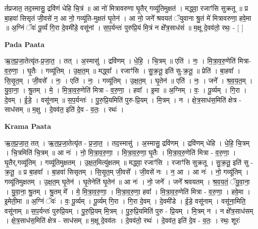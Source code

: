 \documentclass[17pt]{extarticle}
\begin{document}
र्तप्रजात॒ तद॒स्मासु॒ द्रवि॑णं धेहि चि॒त्रं ॥ आ नो॑ मित्रावरुणा घृ॒तैर् गव्यू॑तिमुक्षतं । मद्ध्वा॒ रजाꣳ॑सि सुक्रतू ॥ प्र बा॒हवा॑ सिसृतं जी॒वसे॑ न॒ आ नो॒ गव्यू॑ति-मुक्षतं घृ॒तेन॑ । आ नो॒ जने᳚ श्रवयतं ॅयुवाना श्रु॒तं मे॑ मित्रावरुणा॒ हवे॒मा ॥ अ॒ग्निं ॅवः॑ पू॒र्व्यं गि॒रा दे॒वमी॑डे॒ वसू॑नां । स॒प॒र्यन्तः॑ पुरुप्रि॒यं मि॒त्रं न क्षे᳚त्र॒साध॑सं ॥ म॒क्षू दे॒वव॑तो॒ रथः॒ - [ ] \newline

\textbf{Pada Paata} \newline

ऋ॒त॒प्र॒जा॒तेत्यृ॑त-प्र॒जा॒त॒ । तत् । अ॒स्मासु॑ । द्रवि॑णम् । धे॒हि॒ । चि॒त्रम् ॥ एति॑ । नः॒ । मि॒त्रा॒व॒रु॒णेति॑ मित्रा-व॒रु॒णा॒ । घृ॒तैः । गव्यू॑तिम् । उ॒क्ष॒त॒म् ॥ मद्ध्वा᳚ । रजाꣳ॑सि । सु॒क्र॒तू॒ इति॑ सु-क्र॒तू॒ ॥ प्रेति॑ । बा॒हवा᳚ । सि॒सृ॒त॒म् । जी॒वसे᳚ । नः॒ । एति॑ । नः॒ । गव्यू॑तिम् । उ॒क्ष॒त॒म् । घृ॒तेन॑ ॥ एति॑ । नः॒ । जने᳚ । श्र॒व॒य॒त॒म् । यु॒वा॒ना॒ । श्रु॒तम् । मे॒ । मि॒त्रा॒व॒रु॒णेति॑ मित्रा - व॒रु॒णा॒ । हवा᳚ । इ॒मा ॥ अ॒ग्निम् । वः॒ । पू॒र्व्यम् । गि॒रा । दे॒वम् । ई॒डे॒ । वसू॑नाम् ॥ स॒प॒र्यन्तः॑ । पु॒रु॒प्रि॒यमिति॑ पुरु-प्रि॒यम् । मि॒त्रम् । न । क्षे॒त्र॒साध॑स॒मिति॑ क्षेत्र - साध॑सम् ॥ म॒क्षु । दे॒वव॑त॒ इति॑ दे॒व - व॒तः॒ । रथः॑ ।  \newline


\textbf{Krama Paata} \newline

ऋ॒त॒प्र॒जा॒त॒ तत् । ऋ॒त॒प्र॒जा॒तेत्यृ॑त - प्र॒जा॒त॒ । तद॒स्मासु॑ । अ॒स्मासु॒ द्रवि॑णम् । द्रवि॑णम् धेहि । धे॒हि॒ चि॒त्रम् । चि॒त्रमिति॑ चि॒त्रम् ॥ आ नः॑ । नो॒ मि॒त्रा॒व॒रु॒णा॒ । मि॒त्रा॒व॒रु॒णा॒ घृ॒तैः । मि॒त्रा॒व॒रु॒णेति॑ मित्रा - व॒रु॒णा॒ । घृ॒तैर्,गव्यू॑तिम् । गव्यू॑तिमुक्षतम् । उ॒क्ष॒त॒मित्यु॑क्षतम् ॥ मद्ध्वा॒ रजाꣳ॑सि । रजाꣳ॑सि सुक्रतू । सु॒क्र॒तू॒ इति॑ सु - क्र॒तू॒ ॥ प्र बा॒हवा᳚ । बा॒हवा॑ सिसृतम् । सि॒सृ॒त॒म् जी॒वसे᳚ । जी॒वसे॑ नः । न॒ आ । आ नः॑ । नो॒ गव्यू॑तिम् । गव्यू॑तिमुक्षतम् । उ॒क्ष॒त॒म् घृ॒तेन॑ । घृ॒तेनेति॑ घृ॒तेन॑ ॥ आ नः॑ । नो॒ जने᳚ । जने᳚ श्रवयतम् । श्र॒व॒य॒तं॒ ॅयु॒वा॒ना॒ । यु॒वा॒ना॒ श्रु॒तम् । श्रु॒तम् मे᳚ । मे॒ मि॒त्रा॒व॒रु॒णा॒ । मि॒त्रा॒व॒रु॒णा॒ हवा᳚ । मि॒त्रा॒व॒रु॒णेति॑ मित्रा - व॒रु॒णा॒ । हवे॒मा । इ॒मेती॒मा ॥ अ॒ग्निं ॅवः॑ । वः॒ पू॒र्व्यम् । पू॒र्व्यम् गि॒रा । गि॒रा दे॒वम् । दे॒वमी॑डे । ई॒डे॒ वसू॑नाम् । वसू॑ना॒मिति॒ वसू॑नाम् ॥ स॒प॒र्यन्तः॑ पुरुप्रि॒यम् । पु॒रु॒प्रि॒यम् मि॒त्रम् । पु॒रु॒प्रि॒यमिति॑ पुरु - प्रि॒यम् । मि॒त्रम् न । न क्षे᳚त्र॒साध॑सम् । क्षे॒त्र॒साध॑स॒मिति॑ क्षेत्र - साध॑सम् ॥ म॒क्षू दे॒वव॑तः । दे॒वव॑तो॒ रथः॑ । दे॒वव॑त॒ इति॑ दे॒व - व॒तः॒ । रथः॒ शूरः॑ \newline
\end{document}
